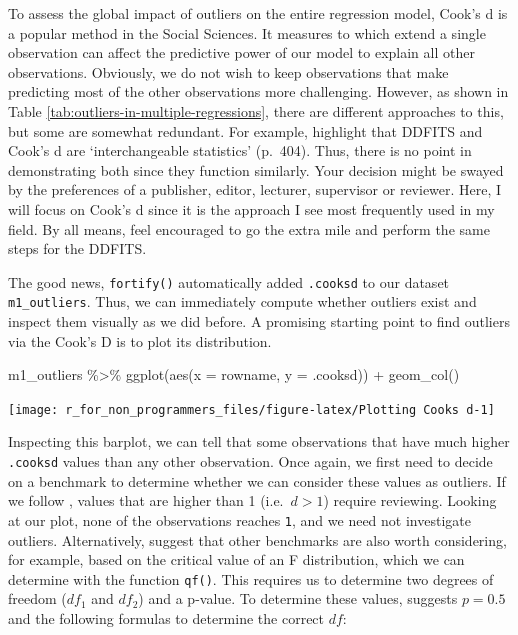 \documentclass[
]{book}
\newenvironment{Shaded}{\begin{snugshade}}{\end{snugshade}}
\newcommand{\AttributeTok}[1]{\textcolor[rgb]{0.77,0.63,0.00}{#1}}
\newcommand{\FunctionTok}[1]{\textcolor[rgb]{0.00,0.00,0.00}{#1}}
\newcommand{\NormalTok}[1]{#1}
\newcommand{\SpecialCharTok}[1]{\textcolor[rgb]{0.00,0.00,0.00}{#1}}
\begin{document}
To assess the global impact of outliers on the entire regression model, Cook's d \citep{cook1982residuals} is a popular method in the Social Sciences. It measures to which extend a single observation can affect the predictive power of our model to explain all other observations. Obviously, we do not wish to keep observations that make predicting most of the other observations more challenging. However, as shown in Table \ref{tab:outliers-in-multiple-regressions}, there are different approaches to this, but some are somewhat redundant. For example, \citet{cohen2014applied} highlight that DDFITS and Cook's d are `interchangeable statistics' (p.~404). Thus, there is no point in demonstrating both since they function similarly. Your decision might be swayed by the preferences of a publisher, editor, lecturer, supervisor or reviewer. Here, I will focus on Cook's d since it is the approach I see most frequently used in my field. By all means, feel encouraged to go the extra mile and perform the same steps for the DDFITS.

The good news, \texttt{fortify()} automatically added \texttt{.cooksd} to our dataset \texttt{m1\_outliers}. Thus, we can immediately compute whether outliers exist and inspect them visually as we did before. A promising starting point to find outliers via the Cook's D is to plot its distribution.

\begin{Shaded}
\begin{Highlighting}[]
\NormalTok{m1\_outliers }\SpecialCharTok{\%\textgreater{}\%}
  \FunctionTok{ggplot}\NormalTok{(}\FunctionTok{aes}\NormalTok{(}\AttributeTok{x =}\NormalTok{ rowname,}
             \AttributeTok{y =}\NormalTok{ .cooksd)) }\SpecialCharTok{+}
  \FunctionTok{geom\_col}\NormalTok{()}
\end{Highlighting}
\end{Shaded}

\begin{center}\texttt{[image: r\_for\_non\_programmers\_files/figure-latex/Plotting Cooks d-1]} \end{center}

Inspecting this barplot, we can tell that some observations that have much higher \texttt{.cooksd} values than any other observation. Once again, we first need to decide on a benchmark to determine whether we can consider these values as outliers. If we follow \citet{cook1982residuals}, values that are higher than 1 (i.e.~\(d > 1\)) require reviewing. Looking at our plot, none of the observations reaches \texttt{1}, and we need not investigate outliers. Alternatively, \citet{cohen2014applied} suggest that other benchmarks are also worth considering, for example, based on the critical value of an F distribution, which we can determine with the function \texttt{qf()}. This requires us to determine two degrees of freedom (\(df_1\) and \(df_2\)) and a p-value. To determine these values, \citet{cohen2014applied} suggests \(p = 0.5\) and the following formulas to determine the correct \(df\):
\end{document}
